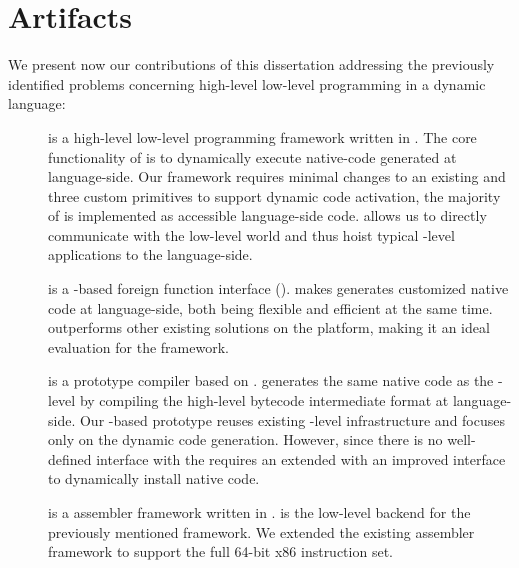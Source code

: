 \section{Artifacts}

We present now our contributions of this dissertation addressing the previously identified problems concerning high-level low-level programming in a dynamic language:

\begin{description}
	\item[\B] is a high-level low-level programming framework written in .
	The core functionality of \B is to dynamically execute native-code generated at language-side.
	Our framework requires minimal changes to an existing \VM and three custom primitives to support dynamic code activation, the majority of \B is implemented as accessible language-side code.
	\B allows us to directly communicate with the low-level world and thus hoist typical \VM-level applications to the language-side.
		
	\item[\NB] is a \B-based foreign function interface (\FFI).
	\NB makes generates customized native code at language-side, both being flexible and efficient at the same time.
	\NB outperforms other existing \FFI solutions on the \PH platform, making it an ideal evaluation for the \B framework.
	
	\item[\NBJ] is a prototype \JIT compiler based on \B.
	\NBJ generates the same native code as the \VM-level \JIT by compiling the high-level bytecode intermediate format at language-side.
	Our \B-based \JIT prototype reuses existing \VM-level infrastructure and focuses only on the dynamic code generation.
	However, since there is no well-defined interface with the \VM \NBJ requires an extended \VM with an improved \JIT interface to dynamically install native code.
	
	\item[\AsmJIT] is a assembler framework written in \PH.
	\AsmJIT is the low-level backend for the previously mentioned \B framework.
	We extended the existing assembler framework to support the full 64-bit x86 instruction set.


\end{description}
